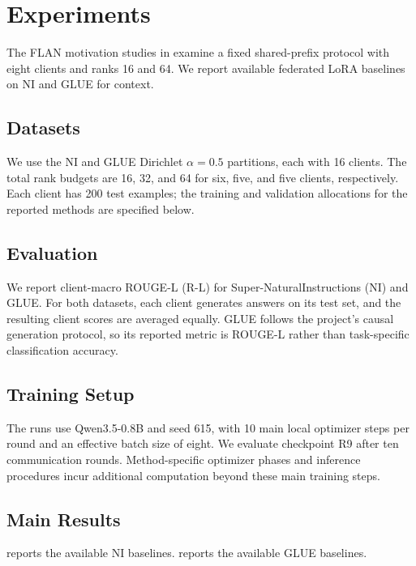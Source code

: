 \section{Experiments}
\label{sec:exp}

The FLAN motivation studies in  examine a fixed shared-prefix protocol with eight clients and ranks 16 and 64.
We report available federated LoRA baselines on NI and GLUE for context.

\subsection{Datasets}
\label{sec:exp:datasets}
We use the NI and GLUE Dirichlet $\alpha=0.5$ partitions, each with 16 clients.
The total rank budgets are 16, 32, and 64 for six, five, and five clients, respectively.
Each client has 200 test examples; the training and validation allocations for the reported methods are specified below.

\subsection{Evaluation}
\label{sec:exp:eval}
We report client-macro ROUGE-L (R-L) for Super-NaturalInstructions (NI) and GLUE.
For both datasets, each client generates answers on its test set, and the resulting client scores are averaged equally.
GLUE follows the project's causal generation protocol, so its reported metric is ROUGE-L rather than task-specific classification accuracy.

\subsection{Training Setup}
\label{sec:exp:environments}
The runs use Qwen3.5-0.8B and seed 615, with 10 main local optimizer steps per round and an effective batch size of eight.
We evaluate checkpoint R9 after ten communication rounds.
Method-specific optimizer phases and inference procedures incur additional computation beyond these main training steps.

\subsection{Main Results}
\label{sec:exp:results}
 reports the available NI baselines.
 reports the available GLUE baselines.

